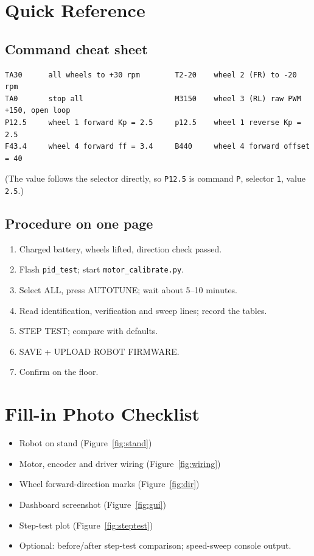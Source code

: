 \documentclass[11pt,a4paper]{report}
\newcommand{\code}[1]{\texttt{#1}}
\begin{document}
\appendix
\chapter{Quick Reference}

\section{Command cheat sheet}
\begin{lstlisting}
TA30      all wheels to +30 rpm        T2-20    wheel 2 (FR) to -20 rpm
TA0       stop all                     M3150    wheel 3 (RL) raw PWM +150, open loop
P12.5     wheel 1 forward Kp = 2.5     p12.5    wheel 1 reverse Kp = 2.5
F43.4     wheel 4 forward ff = 3.4     B440     wheel 4 forward offset = 40
\end{lstlisting}
(The value follows the selector directly, so \code{P12.5} is command \code{P}, selector \code{1}, value \code{2.5}.)

\section{Procedure on one page}
\begin{enumerate}[noitemsep]
  \item Charged battery, wheels lifted, direction check passed.
  \item Flash \code{pid\_test}; start \code{motor\_calibrate.py}.
  \item Select ALL, press AUTOTUNE; wait about 5--10 minutes.
  \item Read identification, verification and sweep lines; record the tables.
  \item STEP TEST; compare with defaults.
  \item SAVE + UPLOAD ROBOT FIRMWARE.
  \item Confirm on the floor.
\end{enumerate}

\chapter{Fill-in Photo Checklist}
\begin{itemize}[noitemsep]
  \item Robot on stand (Figure~\ref{fig:stand})
  \item Motor, encoder and driver wiring (Figure~\ref{fig:wiring})
  \item Wheel forward-direction marks (Figure~\ref{fig:dir})
  \item Dashboard screenshot (Figure~\ref{fig:gui})
  \item Step-test plot (Figure~\ref{fig:steptest})
  \item Optional: before/after step-test comparison; speed-sweep console output.
\end{itemize}
\end{document}
